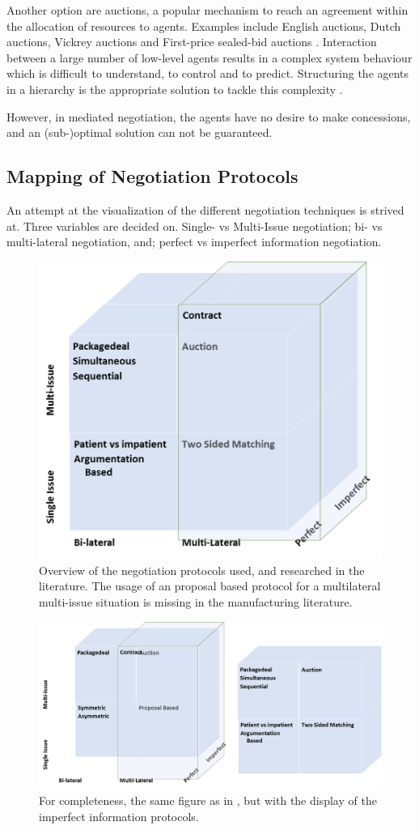 Another option are auctions, a popular mechanism to reach an agreement within the allocation of resources to agents. Examples include English auctions, Dutch auctions, Vickrey auctions and First-price sealed-bid auctions \citep{wooldridge2009introduction}. Interaction between a large number of low-level agents results in a complex system behaviour which is difficult to understand, to control and to predict. Structuring the agents in a hierarchy is the appropriate solution to tackle this complexity \citep{van1998reference}.

However, in mediated negotiation, the agents have no desire to make concessions, and an (sub-)optimal solution can not be guaranteed.

\subsection{Mapping of Negotiation Protocols}
An attempt at the visualization of the different negotiation techniques is strived at. Three variables are decided on. Single- vs Multi-Issue negotiation; bi- vs multi-lateral negotiation, and; perfect vs imperfect information negotiation.  
\begin{figure}[h]
	\centering
	\includegraphics[width=0.7\linewidth]{img/mapping_nego}
	\caption{Overview of the negotiation protocols used, and researched in the literature. The usage of an proposal based protocol for a multilateral multi-issue situation is missing in the manufacturing literature.}
	\label{fig:mapping_nego}
\end{figure}


\begin{figure}[h]
	\centering
	\includegraphics[width=0.9\linewidth]{img/mapping_nego2}
	\caption{For completeness, the same figure as in , but with the display of the imperfect information protocols.}
	\label{fig:mapping_nego2}
\end{figure}

